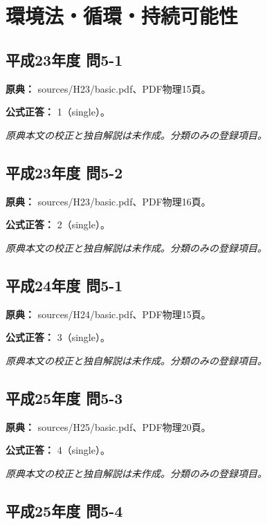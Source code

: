 \section{環境法・循環・持続可能性}

\subsection{平成23年度 問5-1}
\label{q:h23-reg-basic-5-1}

\noindent\textbf{原典：} sources/H23/basic.pdf、PDF物理15頁。

\textbf{公式正答：} 1（single）。

\par\textit{原典本文の校正と独自解説は未作成。分類のみの登録項目。}

\subsection{平成23年度 問5-2}
\label{q:h23-reg-basic-5-2}

\noindent\textbf{原典：} sources/H23/basic.pdf、PDF物理16頁。

\textbf{公式正答：} 2（single）。

\par\textit{原典本文の校正と独自解説は未作成。分類のみの登録項目。}

\subsection{平成24年度 問5-1}
\label{q:h24-reg-basic-5-1}

\noindent\textbf{原典：} sources/H24/basic.pdf、PDF物理15頁。

\textbf{公式正答：} 3（single）。

\par\textit{原典本文の校正と独自解説は未作成。分類のみの登録項目。}

\subsection{平成25年度 問5-3}
\label{q:h25-reg-basic-5-3}

\noindent\textbf{原典：} sources/H25/basic.pdf、PDF物理20頁。

\textbf{公式正答：} 4（single）。

\par\textit{原典本文の校正と独自解説は未作成。分類のみの登録項目。}

\subsection{平成25年度 問5-4}
\label{q:h25-reg-basic-5-4}

